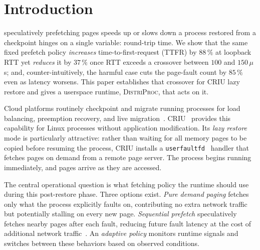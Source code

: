 \documentclass[journal]{IEEEtran}
\newcommand{\distriproc}{\textsc{DistriProc}\xspace}
\newcommand{\uffd}{\texttt{userfaultfd}\xspace}
\begin{document}
\section{Introduction}
\label{sec:intro}

 speculatively prefetching pages speeds up or slows
down a process restored from a checkpoint hinges on a single variable:
round-trip time. We show that the same fixed prefetch policy
\emph{increases} time-to-first-request (TTFR) by $88\,\%$ at loopback RTT
yet \emph{reduces} it by $37\,\%$ once RTT exceeds a crossover between $100$
and $150\,\mu$s; and, counter-intuitively, the harmful case cuts the page-fault count by
$85\,\%$ even as latency worsens. This paper establishes that crossover for
CRIU lazy restore and gives a userspace runtime, \distriproc, that acts on
it.

Cloud platforms routinely checkpoint and migrate running
processes for load balancing, preemption recovery, and live
migration~\cite{clark2005live, sapuntzakis2002optimizing}. CRIU~\cite{criu} provides this
capability for Linux processes without application modification. Its
\emph{lazy restore} mode is particularly attractive: rather than waiting for
all memory pages to be copied before resuming the process, CRIU installs a
\uffd~\cite{userfaultfd, corbet2015userfaultfd} handler that fetches pages
on demand from a remote page server. The process begins running immediately,
and pages arrive as they are accessed.

The central operational question is what fetching policy the runtime should
use during this post-restore phase. Three options exist. \emph{Pure demand
paging} fetches only what the process explicitly faults on, contributing no
extra network traffic but potentially stalling on every new page.
\emph{Sequential prefetch} speculatively fetches nearby pages after each
fault, reducing future fault latency at the cost of additional network
traffic~\cite{chen1995effective}. An \emph{adaptive policy} monitors runtime
signals and switches between these behaviors based on observed conditions.
\end{document}
